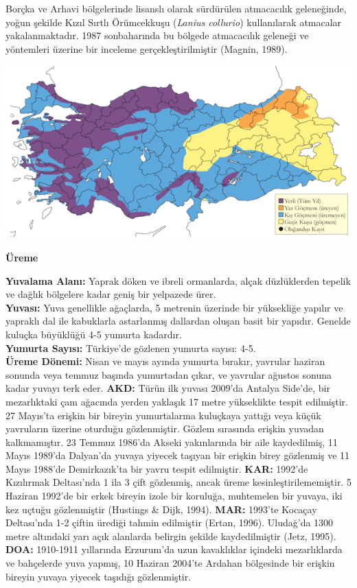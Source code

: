 \documentclass[
  a4paper,
  DIV=11,
  numbers=noendperiod]{scrreprt}
\begin{document}
Borçka ve Arhavi bölgelerinde lisanslı olarak sürdürülen atmacacılık
geleneğinde, yoğun şekilde Kızıl Sırtlı Örümcekkuşu (\emph{Lanius
collurio}) kullanılarak atmacalar yakalanmaktadır. 1987 sonbaharında bu
bölgede atmacacılık geleneği ve yöntemleri üzerine bir inceleme
gerçekleştirilmiştir (Magnin, 1989).

\includegraphics{images/harita_Page_100.png}

\textbf{Üreme}

\textbf{Yuvalama Alanı:} Yaprak döken ve ibreli ormanlarda, alçak
düzlüklerden tepelik ve dağlık bölgelere kadar geniş bir yelpazede
ürer.\\
\textbf{Yuvası:} Yuva genellikle ağaçlarda, 5 metrenin üzerinde bir
yüksekliğe yapılır ve yapraklı dal ile kabuklarla astarlanmış dallardan
oluşan basit bir yapıdır. Genelde kuluçka büyüklüğü 4-5 yumurta
kadardır.\\
\textbf{Yumurta Sayısı:} Türkiye'de gözlenen yumurta sayısı: 4-5.\\
\textbf{Üreme Dönemi:} Nisan ve mayıs ayında yumurta bırakır, yavrular
haziran sonunda veya temmuz başında yumurtadan çıkar, ve yavrular
ağustos sonuna kadar yuvayı terk eder. \textbf{AKD:} Türün ilk yuvası
2009'da Antalya Side'de, bir mezarlıktaki çam ağacında yerden yaklaşık
17 metre yükseklikte tespit edilmiştir. 27 Mayıs'ta erişkin bir bireyin
yumurtalarına kuluçkaya yattığı veya küçük yavruların üzerine oturduğu
gözlenmiştir. Gözlem sırasında erişkin yuvadan kalkmamıştır. 23 Temmuz
1986'da Akseki yakınlarında bir aile kaydedilmiş, 11 Mayıs 1989'da
Dalyan'da yuvaya yiyecek taşıyan bir erişkin birey gözlenmiş ve 11 Mayıs
1988'de Demirkazık'ta bir yavru tespit edilmiştir. \textbf{KAR:} 1992'de
Kızılırmak Deltası'nda 1 ila 3 çift gözlenmiş, ancak üreme
kesinleştirilememiştir. 5 Haziran 1992'de bir erkek bireyin izole bir
koruluğa, muhtemelen bir yuvaya, iki kez uçtuğu gözlenmiştir (Hustings
\& Dijk, 1994). \textbf{MAR:} 1993'te Kocaçay Deltası'nda 1-2 çiftin
ürediği tahmin edilmiştir (Ertan, 1996). Uludağ'da 1300 metre altındaki
yarı açık alanlarda belirgin şekilde kaydedilmiştir (Jetz, 1995).
\textbf{DOA:} 1910-1911 yıllarında Erzurum'da uzun kavaklıklar içindeki
mezarlıklarda ve bahçelerde yuva yapmış, 10 Haziran 2004'te Ardahan
bölgesinde bir erişkin bireyin yuvaya yiyecek taşıdığı gözlenmiştir.
\end{document}
